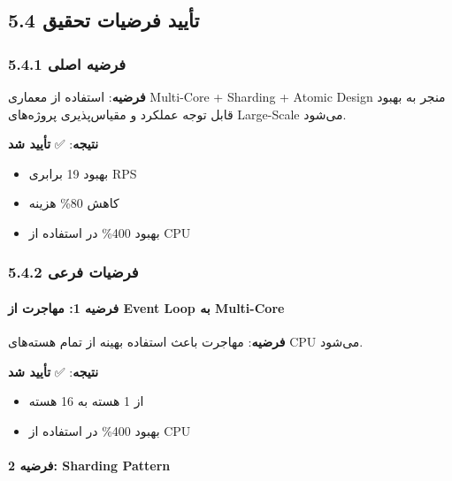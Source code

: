 \documentclass[
]{article}
\providecommand{\tightlist}{%
  \setlength{\itemsep}{0pt}\setlength{\parskip}{0pt}}
\begin{document}
\subsection{5.4 تأیید فرضیات
تحقیق}\label{ux62aux623ux6ccux6ccux62f-ux641ux631ux636ux6ccux627ux62a-ux62aux62dux642ux6ccux642}

\subsubsection{5.4.1 فرضیه
اصلی}\label{ux641ux631ux636ux6ccux647-ux627ux635ux644ux6cc}

\textbf{فرضیه}: استفاده از معماری Multi-Core + Sharding + Atomic Design
منجر به بهبود قابل توجه عملکرد و مقیاس‌پذیری پروژه‌های Large-Scale می‌شود.

\textbf{نتیجه}: ✅ \textbf{تأیید شد}

\begin{itemize}
\tightlist
\item
  بهبود 19 برابری RPS
\item
  کاهش 80\% هزینه
\item
  بهبود 400\% در استفاده از CPU
\end{itemize}

\subsubsection{5.4.2 فرضیات
فرعی}\label{ux641ux631ux636ux6ccux627ux62a-ux641ux631ux639ux6cc}

\paragraph{فرضیه 1: مهاجرت از Event Loop به
Multi-Core}\label{ux641ux631ux636ux6ccux647-1-ux645ux647ux627ux62cux631ux62a-ux627ux632-event-loop-ux628ux647-multi-core}

\textbf{فرضیه}: مهاجرت باعث استفاده بهینه از تمام هسته‌های CPU می‌شود.

\textbf{نتیجه}: ✅ \textbf{تأیید شد}

\begin{itemize}
\tightlist
\item
  از 1 هسته به 16 هسته
\item
  بهبود 400\% در استفاده از CPU
\end{itemize}

\paragraph{فرضیه 2: Sharding
Pattern}\label{ux641ux631ux636ux6ccux647-2-sharding-pattern}
\end{document}
